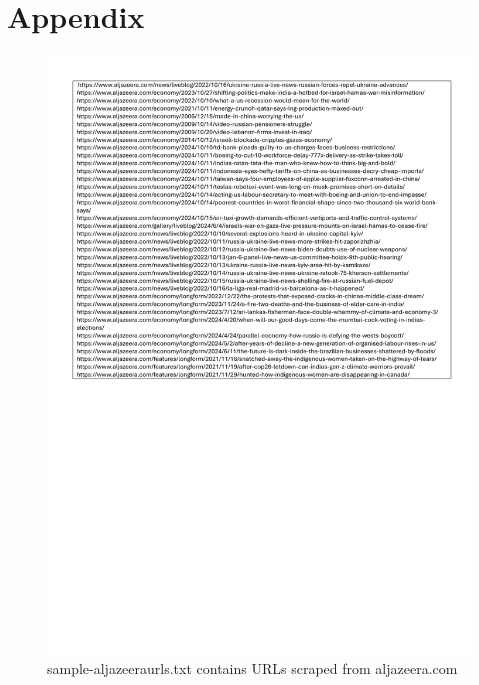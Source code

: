 \chapter{Appendix}
\begin{figure} [H]
    \centering
    \includegraphics[width=0.8\linewidth]{sample-aljazeera.pdf}
    \caption{sample-aljazeeraurls.txt contains URLs scraped from aljazeera.com}
    \label{fig:enter-label}
\end{figure}

